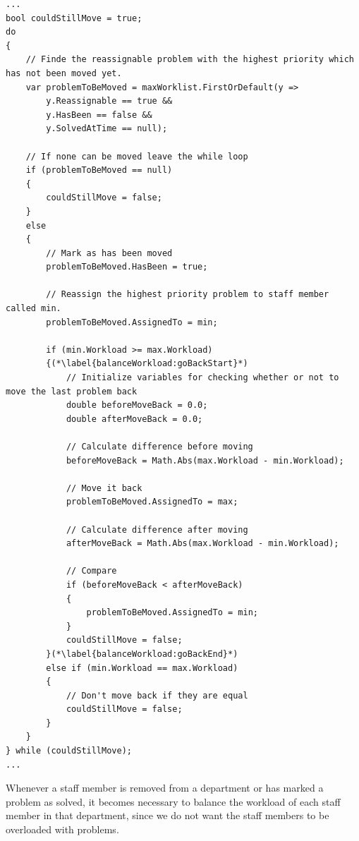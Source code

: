 \begin{lstlisting}[style=sourceCode, caption=\myCaption{A code snippet of the balance workload method. The presented code is within a for loop running for each staff member minus one. ``min'' and ``max'' are the \cl{Person} objects of which the algorithm is currently moving problems between. \vari{maxWorklist} is a sorted worklist, which is sorted before the code snippet is called. It is sorted in non-deacreasing order according to the estimated time consumption}, label=lst:balanceWorkload,float=hp]
...
bool couldStillMove = true;
do
{
    // Finde the reassignable problem with the highest priority which has not been moved yet. 
    var problemToBeMoved = maxWorklist.FirstOrDefault(y =>
	    y.Reassignable == true &&
	    y.HasBeen == false &&
	    y.SolvedAtTime == null);
                  
    // If none can be moved leave the while loop
    if (problemToBeMoved == null)
    {
        couldStillMove = false;
    }
    else
    {
        // Mark as has been moved
        problemToBeMoved.HasBeen = true;

        // Reassign the highest priority problem to staff member called min.
        problemToBeMoved.AssignedTo = min;

        if (min.Workload >= max.Workload)
        {(*\label{balanceWorkload:goBackStart}*)
            // Initialize variables for checking whether or not to move the last problem back
            double beforeMoveBack = 0.0;
            double afterMoveBack = 0.0;

            // Calculate difference before moving
            beforeMoveBack = Math.Abs(max.Workload - min.Workload);

            // Move it back
            problemToBeMoved.AssignedTo = max;

            // Calculate difference after moving
            afterMoveBack = Math.Abs(max.Workload - min.Workload);

            // Compare
            if (beforeMoveBack < afterMoveBack)
            {
                problemToBeMoved.AssignedTo = min;
            }
            couldStillMove = false;
        }(*\label{balanceWorkload:goBackEnd}*)
        else if (min.Workload == max.Workload)
        {
            // Don't move back if they are equal
            couldStillMove = false;
        }
    }
} while (couldStillMove);
...
\end{lstlisting}

Whenever a staff member is removed from a department or has marked a problem as solved, 
it becomes necessary to balance the workload of each staff member in that department, since we do not want the staff members to be overloaded with problems. 

